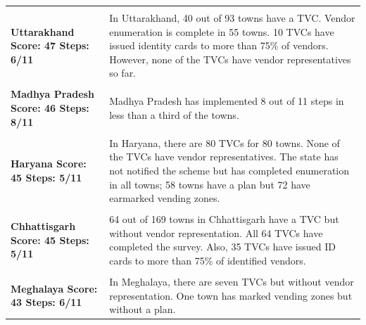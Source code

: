 \documentclass[a4paper, 12pt, twoside, table]{article}
\begin{document}
{\begin{longtable}[l]{>{\raggedright}p{3cm}>{\raggedright\arraybackslash}p{12cm}}
\cellcolor{SVACyellow1} & \cellcolor{SVACyellow2} \\

\cellcolor{SVACyellow1}\bf{Uttarakhand}
\newline
\bf{Score: 47}
\newline
\bf{Steps: 6/11} & \cellcolor{SVACyellow2}In Uttarakhand, 40 out of 93 towns have a TVC. Vendor enumeration is complete in 55 towns. 10 TVCs have issued identity cards to more than 75\% of vendors. However, none of the TVCs have vendor representatives so far. \\

\cellcolor{SVACyellow1} & \cellcolor{SVACyellow2} \\

\cellcolor{SVACyellow1}\bf{Madhya Pradesh}
\newline
\bf{Score: 46}
\newline
\bf{Steps: 8/11} & \cellcolor{SVACyellow2}Madhya Pradesh has implemented 8 out of 11 steps in less than a third of the towns. \\

\cellcolor{SVACyellow1} & \cellcolor{SVACyellow2} \\

\cellcolor{SVACyellow1}\bf{Haryana}
\newline
\bf{Score: 45}
\newline
\bf{Steps: 5/11} & \cellcolor{SVACyellow2}In Haryana, there are 80 TVCs for 80 towns. None of the TVCs have vendor representatives. The state has not notified the scheme but has completed enumeration in all towns; 58 towns have a plan but 72 have earmarked vending zones. \\

\cellcolor{SVACyellow1} & \cellcolor{SVACyellow2} \\

\cellcolor{SVACyellow1}\bf{Chhattisgarh}
\newline
\bf{Score: 45}
\newline
\bf{Steps: 5/11} & \cellcolor{SVACyellow2}64 out of 169 towns in Chhattisgarh have a TVC but without vendor representation. All 64 TVCs have completed the survey. Also, 35 TVCs have issued ID cards to more than 75\% of identified vendors. \\

\cellcolor{SVACyellow1} & \cellcolor{SVACyellow2} \\

\cellcolor{SVACyellow1}\bf{Meghalaya}
\newline
\bf{Score: 43}
\newline
\bf{Steps: 6/11} & \cellcolor{SVACyellow2}In Meghalaya, there are seven TVCs but without vendor representation. One town has marked vending zones but without a plan. \\


\end{longtable}}
\end{document}
